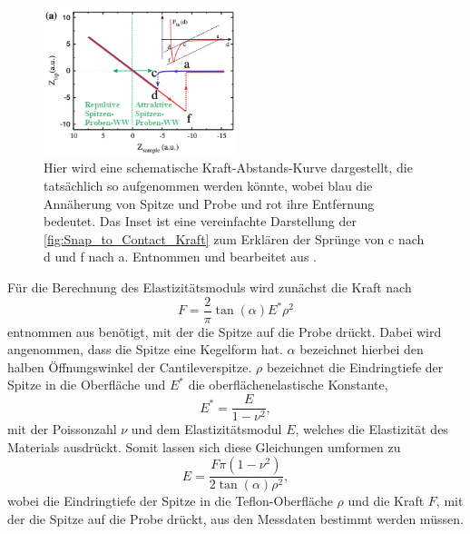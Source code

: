     \begin{figure}[h]
        \centering\captionsetup{format=plain}
        \includegraphics[width=0.5\textwidth]{bilder/Kraft_Abstands_Kurve.png}
        \caption{Hier wird eine schematische Kraft-Abstands-Kurve dargestellt, die tatsächlich so aufgenommen werden könnte, wobei blau die Annäherung von Spitze und Probe und rot ihre Entfernung bedeutet. Das Inset ist eine vereinfachte Darstellung der \autoref{fig:Snap_to_Contact_Kraft} zum Erklären der Sprünge von c nach d und f nach a. Entnommen und bearbeitet aus \cite{voigtlaender}.}
        \label{fig:Kraft_Abstands_Kurve}
    \end{figure}
    \FloatBarrier
    Für die Berechnung des Elastizitätsmoduls wird zunächst die Kraft nach
    \begin{equation}
        F=\frac{2}{\pi}\tan(\alpha)E^*\rho^2
    \end{equation}
    entnommen aus \cite{Elasti} benötigt, mit der die Spitze auf die Probe drückt.
    Dabei wird angenommen, dass die Spitze eine Kegelform hat.
    $\alpha$ bezeichnet hierbei den halben Öffnungswinkel der Cantileverspitze.
    $\rho$ bezeichnet die Eindringtiefe der Spitze in die Oberfläche und $E^*$ die oberflächenelastische Konstante,
    \begin{equation}
        E^*=\frac{E}{1-\nu^2},
    \end{equation}
    mit der Poissonzahl $\nu$ und dem Elastizitätsmodul $E$, welches die Elastizität des Materials ausdrückt.
    Somit lassen sich diese Gleichungen umformen zu
    \begin{equation}
        E=\frac{F\pi(1-\nu^2)}{2\tan(\alpha)\rho^2},
        \label{eqn:Elastizitaetsmodul}
    \end{equation}
    wobei die Eindringtiefe der Spitze in die Teflon-Oberfläche $\rho$ und die Kraft $F$, mit der die Spitze auf die Probe drückt, aus den Messdaten bestimmt werden müssen.
    
